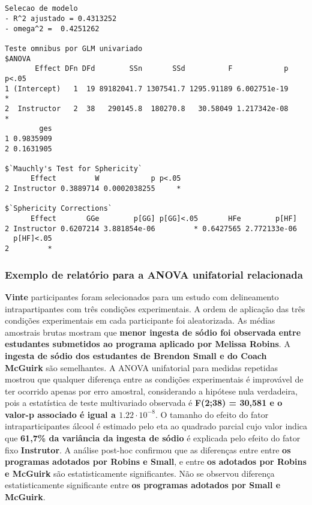 \documentclass[]{article}
\begin{document}
\begin{verbatim}


Selecao de modelo
- R^2 ajustado = 0.4313252 
- omega^2 =  0.4251262 

Teste omnibus por GLM univariado
$ANOVA
       Effect DFn DFd        SSn       SSd          F            p p<.05
1 (Intercept)   1  19 89182041.7 1307541.7 1295.91189 6.002751e-19     *
2  Instructor   2  38   290145.8  180270.8   30.58049 1.217342e-08     *
        ges
1 0.9835909
2 0.1631905

$`Mauchly's Test for Sphericity`
      Effect         W            p p<.05
2 Instructor 0.3889714 0.0002038255     *

$`Sphericity Corrections`
      Effect       GGe        p[GG] p[GG]<.05       HFe        p[HF]
2 Instructor 0.6207214 3.881854e-06         * 0.6427565 2.772133e-06
  p[HF]<.05
2         *
\end{verbatim}

\subsubsection{Exemplo de relatório para a ANOVA unifatorial
relacionada}\label{exemplo-de-relatorio-para-a-anova-unifatorial-relacionada}

\textbf{Vinte} participantes foram selecionados para um estudo com
delineamento intrapartipantes com três condições experimentais. A ordem
de aplicação das três condições experimentais em cada participante foi
aleatorizada. As médias amostrais brutas mostram que \textbf{menor
ingesta de sódio foi observada entre estudantes submetidos ao programa
aplicado por Melissa Robins}. A \textbf{ingesta de sódio dos estudantes
de Brendon Small e do Coach McGuirk} são semelhantes. A ANOVA
unifatorial para medidas repetidas mostrou que qualquer diferença entre
as condições experimentais é improvável de ter ocorrido apenas por erro
amostral, considerando a hipótese nula verdadeira, pois a estatística de
teste multivariado observada é \textbf{F(2;38) = 30,581 e o valor-p
associado é igual a \(1.22 \cdot 10^{-8}\)}. O tamanho do efeito do
fator intraparticipantes álcool é estimado pelo eta ao quadrado parcial
cujo valor indica que \textbf{61,7\% da variância da ingesta de sódio} é
explicada pelo efeito do fator fixo \textbf{Instrutor}. A análise
post-hoc confirmou que as diferenças entre entre \textbf{os programas
adotados por Robins e Small}, e entre \textbf{os adotados por Robins e
McGuirk} são estatisticamente significantes. Não se observou diferença
estatisticamente significante entre \textbf{os programas adotados por
Small e McGuirk}.
\end{document}
